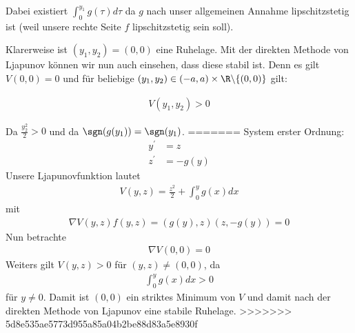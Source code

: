 \begin{solution}
Dabei existiert $\int_0^{y_1} g(\tau)d\tau$ da $g$ nach unser allgemeinen Annahme
lipschitzstetig ist (weil unsere rechte Seite $f$ lipschitzstetig sein soll).

Klarerweise ist $(y_1,y_2) = (0,0)$ eine Ruhelage. Mit der direkten Methode von Ljapunov
können wir nun auch einsehen, dass diese stabil ist. Denn es gilt $V(0,0) = 0$ und für
beliebige $(y_1,y_2) \in (-a,a) \times \R \backslash \{(0,0)\}$ gilt:

\begin{align*}
  V(y_1,y_2) > 0
\end{align*}

Da $\frac{y_2^2}{2} > 0$ und da $\sgn(g(y_1))=\sgn(y_1)$.
=======
System erster Ordnung:
\begin{align*}
  y^{\prime} &=  z\\
  z^{\prime} &= -g(y)
\end{align*}
Unsere Ljapunovfunktion lautet
\begin{align*}
  V(y,z) = \frac{z^2}{2} + \int_0^y g(x) dx
\end{align*}
mit
\begin{align*}
  \nabla V(y,z)f(y,z) = (g(y),z)(z,-g(y)) = 0
\end{align*}
Nun betrachte
\begin{align*}
  \nabla V(0,0) = 0
\end{align*}
Weiters gilt $V(y,z) > 0$ für $(y,z) \neq (0,0)$, da
\begin{align*}
  \int_0^y g(x) dx > 0
\end{align*}
für $y \neq 0$.
Damit ist $(0,0)$ ein striktes Minimum von $V$ und damit nach der direkten Methode
von Ljapunov eine stabile Ruhelage.
>>>>>>> 5d8e535ae5773d955a85a04b2be88d83a5e8930f
\end{solution}
